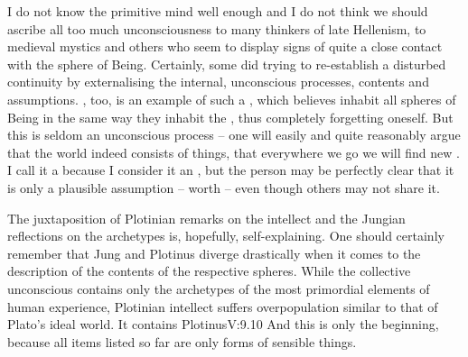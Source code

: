 {  \pa I do not know the primitive mind well enough and I do not think we should
  ascribe all too much unconsciousness to many thinkers of late Hellenism, to
  medieval mystics and others who seem to display signs of quite a close contact
  with the  sphere of Being.  Certainly, some did 
  trying to re-establish a disturbed continuity by externalising the internal,
  unconscious processes, contents and assumptions.  ,
  too, is an example of such a , which believes 
  inhabit all spheres of Being in the same way they inhabit the , thus completely forgetting oneself.  But this is seldom an
  unconscious process -- one will easily and quite reasonably argue that the
  world indeed consists of things, that everywhere we go we will find new
  .  I call it a  because I consider it an
  , but the person may be perfectly clear that it is only a
  plausible assumption -- worth  -- even though others may not
  share it.
} %

\pa The juxtaposition of Plotinian remarks on the intellect and the Jungian
reflections on the archetypes is, hopefully, self-explaining.  One should
certainly remember that Jung and Plotinus diverge drastically when it comes to
the description of the contents of the respective spheres.  While the collective
unconscious contains only the archetypes of the most primordial elements of
human experience, Plotinian intellect suffers overpopulation similar to that of
Plato's ideal world. It contains \citet{qualities, accordant with Nature, and
  quantities; number and mass; origins and conditions; all actions and
  experiences not against nature; movement and repose, both the universals and
  the particulars: but There time is replaced by eternity and space by its
  intellectual equivalent, mutual inclusiveness.}{Plotinus}{V:9.10} And this is
only the beginning, because all items listed so far are only forms of sensible
things.

